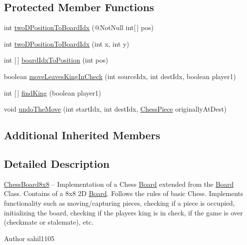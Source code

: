 \subsection*{Protected Member Functions}
\begin{DoxyCompactItemize}
\item 
int \mbox{\hyperlink{class_chess_board8x8_a10f0c0aa276bc842b54c1011120d581d}{two\+D\+Position\+To\+Board\+Idx}} (@Not\+Null int\mbox{[}$\,$\mbox{]} pos)
\item 
int \mbox{\hyperlink{class_chess_board8x8_af12fb8a2eb5b727375727717d448534f}{two\+D\+Position\+To\+Board\+Idx}} (int x, int y)
\item 
int \mbox{[}$\,$\mbox{]} \mbox{\hyperlink{class_chess_board8x8_a6a04078bf0064b2f144327bb7ac8c026}{board\+Idx\+To\+Position}} (int pos)
\item 
boolean \mbox{\hyperlink{class_chess_board8x8_a42067cd28d278d9a0534105b57edf635}{move\+Leaves\+King\+In\+Check}} (int source\+Idx, int dest\+Idx, boolean player1)
\item 
int \mbox{[}$\,$\mbox{]} \mbox{\hyperlink{class_chess_board8x8_a5197215b78b6870d81ae12a76d28177e}{find\+King}} (boolean player1)
\item 
void \mbox{\hyperlink{class_chess_board8x8_a559ca5493556a5f287b822b53117b7a6}{undo\+The\+Move}} (int start\+Idx, int dest\+Idx, \mbox{\hyperlink{class_chess_piece}{Chess\+Piece}} originally\+At\+Dest)
\end{DoxyCompactItemize}
\subsection*{Additional Inherited Members}


\subsection{Detailed Description}
\mbox{\hyperlink{class_chess_board8x8}{Chess\+Board8x8}} -- Implementation of a Chess \mbox{\hyperlink{class_board}{Board}} extended from the \mbox{\hyperlink{class_board}{Board}} Class. Contains of a 8x8 2D \mbox{\hyperlink{class_board}{Board}}. Follows the rules of basic Chess. Implements functionality such as moving/capturing pieces, checking if a piece is occupied, initializing the board, checking if the player\textquotesingle{}s king is in check, if the game is over (checkmate or stalemate), etc. \begin{DoxyAuthor}{Author}
sahil1105 
\end{DoxyAuthor}


